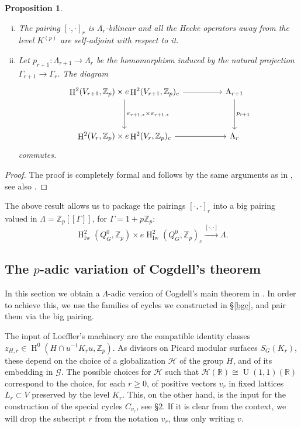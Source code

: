 \documentclass[12pt,a4paper,reqno]{amsart}
\theoremstyle{definition}
\numberwithin{definition}{subsection}
\theoremstyle{definition}
\numberwithin{Definition}{subsection}
\theoremstyle{remark}
\theoremstyle{remark}
\numberwithin{Remark}{subsection}
\theoremstyle{remark}
\theoremstyle{plain}
\numberwithin{Theorem}{subsection}
\theoremstyle{plain}
\theoremstyle{plain}
\theoremstyle{plain}
\theoremstyle{plain}
\theoremstyle{plain}
\theoremstyle{plain}
\newtheorem{Proposition}[Theorem]{Proposition}
\theoremstyle{plain}
\newcommand*{\Z}{\mathbb{Z}}
\newcommand*{\R}{\mathbb{R}}
\DeclareMathOperator{\U}{U}
\DeclareMathOperator{\h}{H}
\begin{document}
\begin{Proposition}
\label{pairing}
\begin{enumerate}[(i)]
\item The pairing $[\cdot,\cdot]_r$ is $\Lambda_r$-bilinear and all the Hecke operators away from the level $K^{(p)}$ are self-adjoint with respect to it.
\item Let $p_{r+1}:\Lambda_{r+1}\to \Lambda_r$ be the homomorphism induced by the natural projection $\Gamma_{r+1}\to \Gamma_r$. The diagram
\[
\begin{tikzcd}[row sep=huge, column sep=huge]
\h^2(V_{r+1},\Z_p)\times e\h^2(V_{r+1},\Z_p)_{c} \arrow[d, "\pi_{r+1,*}\times \pi_{r+1,*}"] \arrow[r,""]    &   \Lambda_{r+1} \arrow[d,"p_{r+1}"]  \\
\h^2(V_r,\Z_p)\times e\h^2(V_r,\Z_p)_{c} \arrow[r,""] & \Lambda_r 
\end{tikzcd}
\]
commutes.
\end{enumerate}
\end{Proposition}

\begin{proof}
The proof is completely formal and follows by the same arguments as in \cite[p. 44-45]{fornea}, see also \cite[p. 12]{darmon}.
\end{proof}

The above result allows us to package the pairings $[\cdot,\cdot]_{r}$ into a big pairing valued in $\Lambda=\Z_p[[\Gamma]]$, for $\Gamma=1+p\Z_p$:
\[
\h_{\text{Iw}}^2(Q_G^0,\Z_p)\times e\h_{\text{Iw}}^2(Q_G^0,\Z_p)_{c}\xrightarrow{[\cdot,\cdot]} \Lambda.
\]

\subsection{The $p$-adic variation of Cogdell's theorem}
In this section we obtain a $\Lambda$-adic version of Cogdell's main theorem in \cite{cogdell}. In order to achieve this, we use the families of cycles we constructed in \S\ref{bgc}, and pair them via the big pairing. 

The input of Loeffler's machinery are the compatible identity classes $z_{H,r}\in \h^0(H\cap u^{-1}K_ru,\Z_p)$. As divisors on Picard modular surfaces $S_G(K_r)$, these depend on the choice of a globalization $\mathcal{H}$ of the group $H$, and of its embedding in $\mathcal{G}$. The possible choices for $\mathcal{H}$ such that $\mathcal{H}(\R)\cong\U(1,1)(\R)$ correspond to the choice, for each $r\geq 0$, of positive vectors $v_r$ in fixed lattices $L_r\subset V$ preserved by the level $K_r$. This, on the other hand, is the input for the construction of the special cycles $C_{v_r}$, see \S $2$. If it is clear from the context, we will drop the subscript $r$ from the notation $v_r$, thus only writing $v$.
\end{document}
